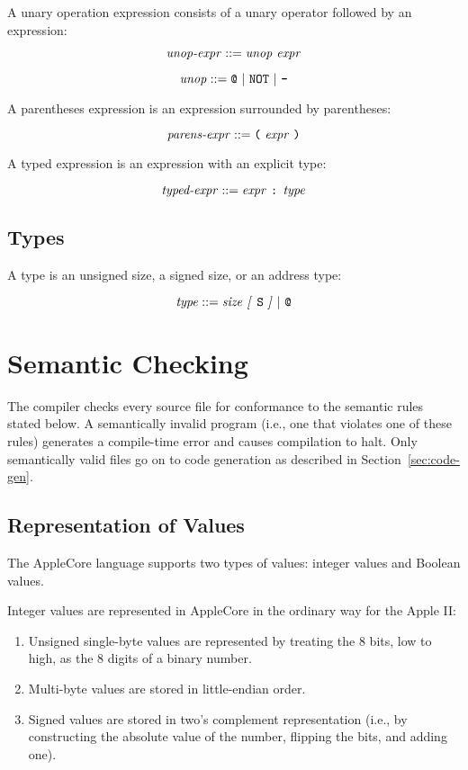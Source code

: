 \documentclass[10pt]{article}
\begin{document}
 A unary operation expression
consists of a unary operator followed by an expression:

$$\mbox{\textit{unop-expr}} ::= \mbox{\ensuremath{\mbox{\textit{unop}}} \ensuremath{\mbox{\textit{expr}}}}$$

$$\mbox{\textit{unop}} ::= \mbox{\texttt{@} $|$ \texttt{NOT} $|$ \texttt{-}}$$

 A parentheses expression is an
expression surrounded by parentheses:

$$\mbox{\textit{parens-expr}} ::= \mbox{\texttt{(} \ensuremath{\mbox{\textit{expr}}} \texttt{)}}$$

 A typed expression is an expression with
an explicit type:

$$\mbox{\textit{typed-expr}} ::= \mbox{\ensuremath{\mbox{\textit{expr}}} \texttt{:}
  \ensuremath{\mbox{\textit{type}}}}$$

\subsection{Types}

A type is an unsigned size, a signed size, or an address type:

$$\mbox{\textit{type}} ::= \mbox{\ensuremath{\mbox{\textit{size}}} \textit{[} \texttt{S} \textit{]} $|$ \texttt{@}}$$



\section{Semantic Checking}
\label{sec:semantics}

The compiler checks every source file for conformance to the semantic
rules stated below.  A semantically invalid program (i.e., one that
violates one of these rules) generates a compile-time error and causes
compilation to halt.  Only semantically valid files go on to code
generation as described in Section~\ref{sec:code-gen}.

\subsection{Representation of Values}
\label{sec:semantics:values}

The AppleCore language supports two types of values: integer values
and Boolean values.

 Integer values are represented in AppleCore
in the ordinary way for the Apple II:
%
\begin{enumerate}
%
\item Unsigned single-byte values are represented by treating the 8
  bits, low to high, as the 8 digits of a binary number.
%
\item Multi-byte values are stored in little-endian order.
%
\item Signed values are stored in two's complement representation
  (i.e., by constructing the absolute value of the number, flipping
  the bits, and adding one).
%
\end{enumerate}
\end{document}
